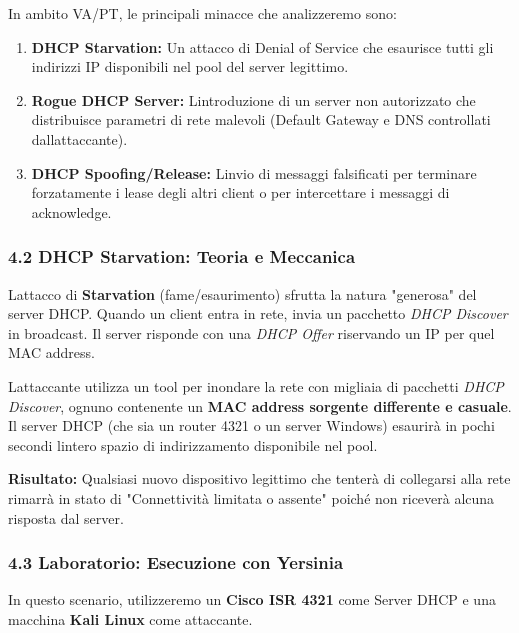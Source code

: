 \documentclass[11pt,a4paper]{article}
\begin{document}
In ambito VA/PT, le principali minacce che analizzeremo sono:

\begin{enumerate}
\def\labelenumi{\arabic{enumi}.}
\item
  \textbf{DHCP Starvation:} Un attacco di Denial of Service che
  esaurisce tutti gli indirizzi IP disponibili nel pool del server
  legittimo.
\item
  \textbf{Rogue DHCP Server:} L\textquotesingle introduzione di un
  server non autorizzato che distribuisce parametri di rete malevoli
  (Default Gateway e DNS controllati dall\textquotesingle attaccante).
\item
  \textbf{DHCP Spoofing/Release:} L\textquotesingle invio di messaggi
  falsificati per terminare forzatamente i lease degli altri client o
  per intercettare i messaggi di acknowledge.
\end{enumerate}

\subsubsection{4.2 DHCP Starvation: Teoria e
Meccanica}\label{dhcp-starvation-teoria-e-meccanica}

L\textquotesingle attacco di \textbf{Starvation} (fame/esaurimento)
sfrutta la natura "generosa" del server DHCP. Quando un client entra in
rete, invia un pacchetto \emph{DHCP Discover} in broadcast. Il server
risponde con una \emph{DHCP Offer} riservando un IP per quel MAC
address.

L\textquotesingle attaccante utilizza un tool per inondare la rete con
migliaia di pacchetti \emph{DHCP Discover}, ognuno contenente un
\textbf{MAC address sorgente differente e casuale}. Il server DHCP (che
sia un router 4321 o un server Windows) esaurirà in pochi secondi
l\textquotesingle intero spazio di indirizzamento disponibile nel pool.

\textbf{Risultato:} Qualsiasi nuovo dispositivo legittimo che tenterà di
collegarsi alla rete rimarrà in stato di "Connettività limitata o
assente" poiché non riceverà alcuna risposta dal server.

\subsubsection{4.3 Laboratorio: Esecuzione con
Yersinia}\label{laboratorio-esecuzione-con-yersinia}

In questo scenario, utilizzeremo un \textbf{Cisco ISR 4321} come Server
DHCP e una macchina \textbf{Kali Linux} come attaccante.
\end{document}

